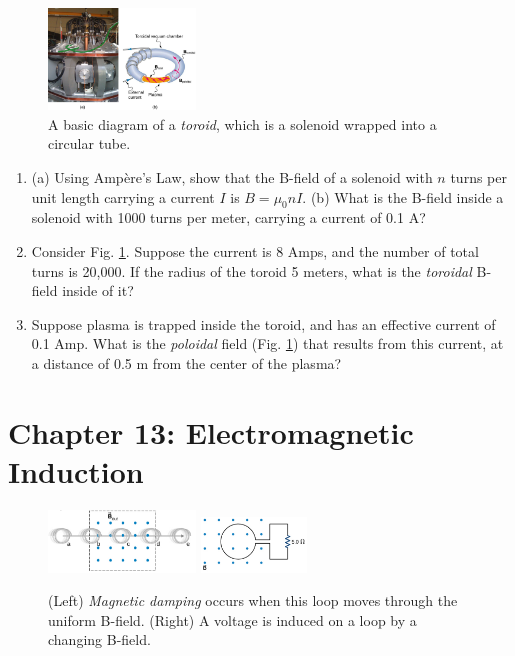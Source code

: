 \documentclass[10pt]{article}
\begin{document}
\begin{figure}[ht]
\centering
\includegraphics[width=0.35\textwidth,trim=8.5cm 1cm 0cm 3cm,clip=true]{toroid.jpeg}
\caption{\label{fig:chap12_1} A basic diagram of a \textit{toroid}, which is a solenoid wrapped into a circular tube.}
\end{figure}

\begin{enumerate}
\item (a) Using Amp\`{e}re's Law, show that the B-field of a solenoid with $n$ turns per unit length carrying a current $I$ is $B = \mu_0 n I$. (b) What is the B-field inside a solenoid with 1000 turns per meter, carrying a current of 0.1 A? \\ \vspace{1cm}
\item Consider Fig. \ref{fig:chap12_1}.  Suppose the current is 8 Amps, and the number of total turns is 20,000. If the radius of the toroid 5 meters, what is the \textit{toroidal} B-field inside of it? \\ \vspace{1cm}
\item Suppose plasma is trapped inside the toroid, and has an effective current of 0.1 Amp. What is the \textit{poloidal} field (Fig. \ref{fig:chap12_1}) that results from this current, at a distance of 0.5 m from the center of the plasma? \\ \vspace{1cm}
\end{enumerate}

\section{Chapter 13: Electromagnetic Induction}

\begin{figure}
\centering
\includegraphics[width=0.35\textwidth]{magdamp.png} \hspace{0.5cm}
\includegraphics[width=0.25\textwidth]{loopsine.png} 
\caption{\label{fig:chap13_1} (Left) \textit{Magnetic damping} occurs when this loop moves through the uniform B-field. (Right) A voltage is induced on a loop by a changing B-field.}
\end{figure}
\end{document}
